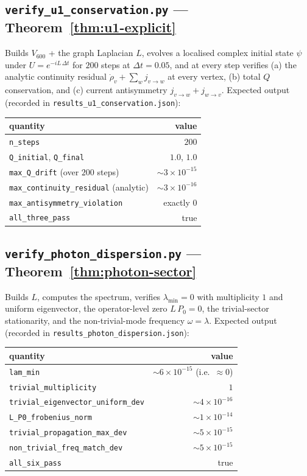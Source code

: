 \documentclass[11pt]{article}
\theoremstyle{definition}
\begin{document}
\subsection*{\texttt{verify\_u1\_conservation.py} --- Theorem~\ref{thm:u1-explicit}}

Builds $V_{600}$ + the graph Laplacian $L$, evolves a localised complex initial state $\psi$ under $U = e^{-iL\,\Delta t}$ for $200$ steps at $\Delta t = 0.05$, and at every step verifies (a) the analytic continuity residual $\dot\rho_v + \sum_w j_{v\to w}$ at every vertex, (b) total $Q$ conservation, and (c) current antisymmetry $j_{v\to w} + j_{w\to v}$. Expected output (recorded in \texttt{results\_u1\_conservation.json}):

\begin{center}\small
\begin{tabular}{@{}lr@{}}
\toprule
quantity & value \\
\midrule
\texttt{n\_steps} & $200$ \\
\texttt{Q\_initial}, \texttt{Q\_final} & $1.0$, $1.0$ \\
\texttt{max\_Q\_drift} (over $200$ steps) & $\sim 3 \times 10^{-15}$ \\
\texttt{max\_continuity\_residual} (analytic) & $\sim 3 \times 10^{-16}$ \\
\texttt{max\_antisymmetry\_violation} & exactly $0$ \\
\texttt{all\_three\_pass} & true \\
\bottomrule
\end{tabular}
\end{center}

\subsection*{\texttt{verify\_photon\_dispersion.py} --- Theorem~\ref{thm:photon-sector}}

Builds $L$, computes the spectrum, verifies $\lambda_{\min} = 0$ with multiplicity $1$ and uniform eigenvector, the operator-level zero $L\,P_0 = 0$, the trivial-sector stationarity, and the non-trivial-mode frequency $\omega = \lambda$. Expected output (recorded in \texttt{results\_photon\_dispersion.json}):

\begin{center}\small
\begin{tabular}{@{}lr@{}}
\toprule
quantity & value \\
\midrule
\texttt{lam\_min} & $\sim 6 \times 10^{-15}$ (i.e.\ $\approx 0$) \\
\texttt{trivial\_multiplicity} & $1$ \\
\texttt{trivial\_eigenvector\_uniform\_dev} & $\sim 4 \times 10^{-16}$ \\
\texttt{L\_P0\_frobenius\_norm} & $\sim 1 \times 10^{-14}$ \\
\texttt{trivial\_propagation\_max\_dev} & $\sim 5 \times 10^{-15}$ \\
\texttt{non\_trivial\_freq\_match\_dev} & $\sim 5 \times 10^{-15}$ \\
\texttt{all\_six\_pass} & true \\
\bottomrule
\end{tabular}
\end{center}
\end{document}
